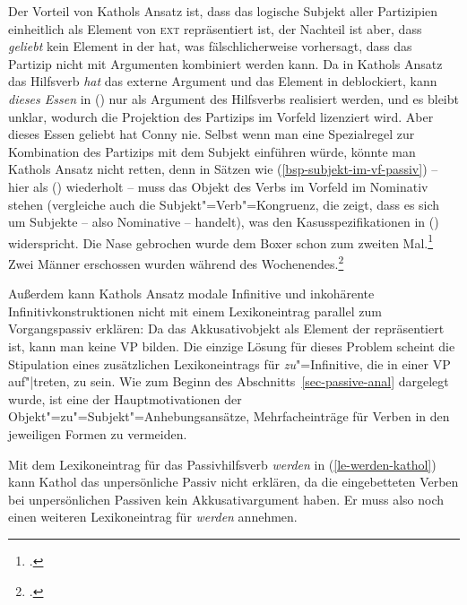 {Der Vorteil von Kathols Ansatz ist, dass das logische Subjekt
aller Partizipien einheitlich als Element von \textsc{ext} repräsentiert ist,
der Nachteil ist aber, dass \emph{geliebt} kein Element in der \compsl hat,
was fälschlicherweise vorhersagt, dass das Partizip nicht mit Argumenten kombiniert
werden kann. Da in Kathols Ansatz das Hilfsverb \emph{hat} das externe Argument und das
Element in \subj deblockiert, kann \emph{dieses Essen} in () nur als Argument des Hilfsverbs
realisiert werden, und es bleibt unklar, wodurch die Projektion des Partizips im Vorfeld
lizenziert wird.
\ea
Aber dieses Essen geliebt hat Conny nie.
\z
Selbst wenn man eine Spezialregel zur Kombination des Partizips mit dem Subjekt einführen würde,
könnte man Kathols Ansatz nicht retten, denn in Sätzen wie (\ref{bsp-subjekt-im-vf-passiv}) -- hier als
() wiederholt -- muss das Objekt
des Verbs im Vorfeld im Nominativ stehen (vergleiche auch die Subjekt"=Verb"=Kongruenz, die zeigt,
dass es sich um Subjekte -- also Nominative -- handelt), was den Kasusspezifikationen in () widerspricht.
\eal
\label{bsp-subjekt-im-vf-passiv-zwei}
\ex{}
Die Nase gebrochen wurde dem Boxer schon zum zweiten Mal.\footnote{
        .
}
\ex{}
Zwei Männer erschossen wurden    während des Wochenendes.\footnote{
        .%
        }
\label{bsp-subjekt-im-vf-passiv-letzt-zwei}
\zl

\noindent
Außerdem kann Kathols Ansatz modale Infinitive 
und inkohärente Infinitivkonstruktionen nicht mit einem Lexikoneintrag parallel zum Vorgangspassiv
erklären:
Da das Akkusativobjekt als Element der \subjl repräsentiert ist, kann man keine VP
bilden. Die einzige Lösung für dieses Problem scheint die Stipulation eines zusätzlichen
Lexikoneintrags für \emph{zu}"=Infinitive, die in einer VP auf"|treten, zu sein.
Wie zum Beginn des Abschnitts~\ref{sec-passive-anal} dargelegt wurde, ist eine der Hauptmotivationen
der Objekt"=zu"=Subjekt"=Anhebungsansätze, Mehrfacheinträge für Verben in den jeweiligen
Formen zu vermeiden.

Mit dem Lexikoneintrag für das Passivhilfsverb \emph{werden} in (\ref{le-werden-kathol}) 
kann Kathol das unpersönliche Passiv nicht erklären, da die eingebetteten Verben bei unpersönlichen Passiven kein
Akkusativargument haben. Er muss also noch einen weiteren Lexikoneintrag für \emph{werden}
annehmen.

}
